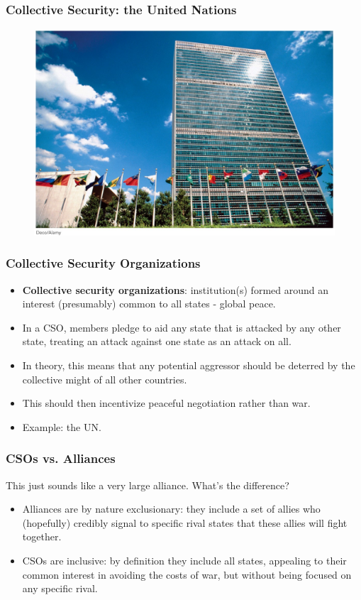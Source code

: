 \documentclass{beamer}
\begin{document}
\begin{frame} 
	\frametitle{\LARGE{Collective Security: the United Nations}}
	\begin{figure}[ht!]
		\centering
		\includegraphics[width=\textwidth,height=\textheight,keepaspectratio]{UNhq.jpg}
	\end{figure}
\end{frame}	

\begin{frame} 
	\frametitle{\LARGE{Collective Security Organizations}}
		\begin{itemize}
			\item \textbf{Collective security organizations}: institution(s) formed around an interest (presumably) common to all states - global peace.  \pause 
			\item In a CSO, members pledge to aid any state that is attacked by any other state, treating an attack against one state as an attack on all. \pause
			\item In theory, this means that any potential aggressor should be deterred by the collective might of all other countries. \pause
			\item This should then incentivize peaceful negotiation rather than war. \pause
			\item Example: the UN.
		\end{itemize}
\end{frame}


\begin{frame} 
	\frametitle{\LARGE{CSOs vs. Alliances}}
This just sounds like a very large alliance. What's the difference?
	\begin{itemize}
		\item Alliances are by nature exclusionary: they include a set of allies who (hopefully) credibly signal to specific rival states that these allies will fight together. \pause
		\item CSOs are inclusive: by definition they include all states, appealing to their common interest in avoiding the costs of war, but without being focused on any specific rival.
	\end{itemize}
\end{frame}
\end{document}
